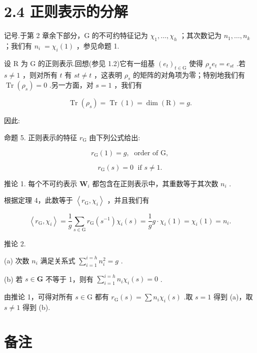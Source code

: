 \section*{2.4 正则表示的分解}

记号.于第 2 章余下部分，G 的不可约特征记为 \({\chi }_{1},\ldots ,{\chi }_{h}\) ；其次数记为 \({n}_{1},\ldots ,{n}_{k}\) ；我们有 \({n}_{i} \; = {\chi }_{i}\left( 1\right)\) ，参见命题 1.

设 \(\mathrm{R}\) 为 \(\mathrm{G}\) 的正则表示.回想(参见 1.2)它有一组基 \({\left( {e}_{t}\right) }_{t \in  \mathrm{G}}\) 使得 \({\rho }_{s}{e}_{t} = {e}_{st}\) .若 \(s \neq  1\) ，则对所有 \(t\) 有 \({st} \neq  t\) ，这表明 \({\rho }_{s}\) 的矩阵的对角项为零；特别地我们有 \(\operatorname{Tr}\left( {\rho }_{s}\right)  = 0\) .另一方面，对 \(s = 1\) ，我们有

\[
\operatorname{Tr}\left( {\rho }_{s}\right)  = \operatorname{Tr}\left( 1\right)  = \dim \left( \mathrm{R}\right)  = g.
\]

因此:

命题 5. 正则表示的特征 \({r}_{\mathrm{G}}\) 由下列公式给出:

\[
{r}_{\mathrm{G}}\left( 1\right)  = g,\;\text{ order of }\mathrm{G},
\]

\[
{r}_{\mathrm{G}}\left( s\right)  = 0\;\text{ if }s \neq  1.
\]

推论 1. 每个不可约表示 \({\mathbf{W}}_{i}\) 都包含在正则表示中，其重数等于其次数 \({n}_{i}\) .

根据定理 4，此数等于 \(\left\langle  {{r}_{\mathrm{G}},{\chi }_{i}}\right\rangle\) ，并且我们有

\[
\left\langle  {{r}_{\mathrm{G}},{\chi }_{i}}\right\rangle   = \frac{1}{g}\mathop{\sum }\limits_{{s \in  \mathrm{G}}}{r}_{\mathrm{G}}\left( {s}^{-1}\right) {\chi }_{i}\left( s\right)  = \frac{1}{g}g \cdot  {\chi }_{i}\left( 1\right)  = {\chi }_{i}\left( 1\right)  = {n}_{i}.
\]

推论 2.

(a) 次数 \({n}_{i}\) 满足关系式 \(\mathop{\sum }\limits_{{i = 1}}^{{i = h}}{n}_{i}^{2} = g\) .

(b) 若 \(s \in  \mathbf{G}\) 不等于 1，则有 \(\mathop{\sum }\limits_{{i = 1}}^{{i = h}}{n}_{i}{\chi }_{i}\left( s\right)  = 0\) .

由推论 1，可得对所有 \(s \in  \mathrm{G}\) 都有 \({r}_{\mathrm{G}}\left( s\right)  = \sum {n}_{i}{\chi }_{i}\left( s\right)\) .取 \(s = 1\) 得到 (a)，取 \(s \neq  1\) 得到 (b).

\section*{备注}

